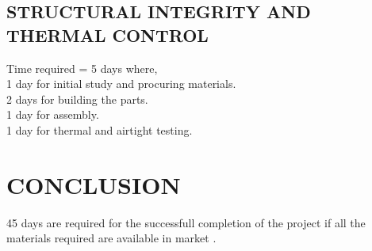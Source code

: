 \documentclass[9pt]{IEEEtran}
\begin{document}
\subsection{STRUCTURAL INTEGRITY AND THERMAL CONTROL}
Time required = 5 days where,
\\ 1 day for initial study and procuring materials.
\\ 2 days for building the parts.
\\ 1 day for assembly.
\\ 1 day for thermal and airtight testing.



\section{CONCLUSION}
45 days are required for the successfull completion of the project if all the materials required are available in market .
\end{document}
